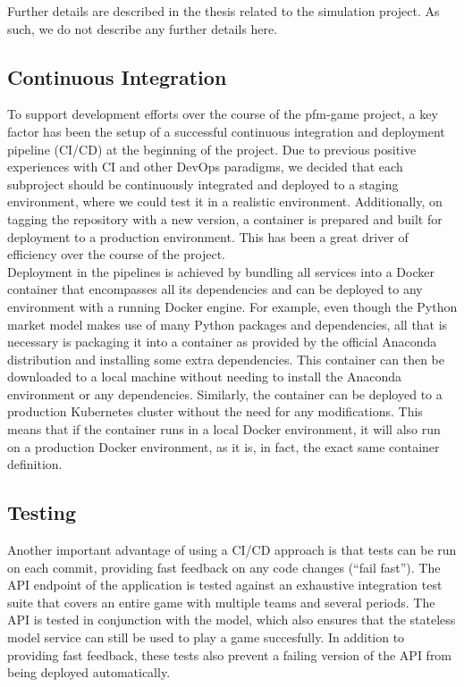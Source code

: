 Further details are described in the thesis related to the simulation project. As such, we do not describe any further details here.


\subsection{Continuous Integration}

To support development efforts over the course of the pfm-game project, a key factor has been the setup of a successful continuous integration and deployment pipeline (CI/CD) at the beginning of the project. Due to previous positive experiences with CI and other DevOps paradigms, we decided that each subproject should be continuously integrated and deployed to a staging environment, where we could test it in a realistic environment. Additionally, on tagging the repository with a new version, a container is prepared and built for deployment to a production environment. This has been a great driver of efficiency over the course of the project. \\

Deployment in the pipelines is achieved by bundling all services into a Docker container that encompasses all its dependencies and can be deployed to any environment with a running Docker engine. For example, even though the Python market model makes use of many Python packages and dependencies, all that is necessary is packaging it into a container as provided by the official Anaconda distribution and installing some extra dependencies. This container can then be downloaded to a local machine without needing to install the Anaconda environment or any dependencies. Similarly, the container can be deployed to a production Kubernetes cluster without the need for any modifications. This means that if the container runs in a local Docker environment, it will also run on a production Docker environment, as it is, in fact, the exact same container definition.\\


\subsection{Testing}
Another important advantage of using a CI/CD approach is that tests can be run on each commit, providing fast feedback on any code changes (``fail fast''). The API endpoint of the application is tested against an exhaustive integration test suite that covers an entire game with multiple teams and several periods. The API is tested in conjunction with the model, which also ensures that the stateless model service can still be used to play a game succesfully. In addition to providing fast feedback, these tests also prevent a failing version of the API from being deployed automatically.